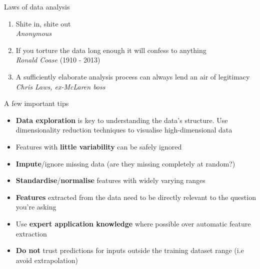 \documentclass[pdf]{beamer}
\begin{document}
\begin{frame}{Laws of data analysis}
\begin{enumerate}\addtolength{\itemsep}{1.5\baselineskip}
	\item<2-> Shite in, shite out\\
			\textit{Anonymous}
	\item<3-> If you torture the data long enough it will confess to anything\\
			\textit{Ronald Coase} (1910 - 2013)
	\item<4-> A sufficiently elaborate analysis process can always lend an air of legitimacy\\ 
			\textit{Chris Laws, ex-McLaren boss} 
\end{enumerate}
\end{frame}

\begin{frame}{A few important tips}
\begin{itemize}\addtolength{\itemsep}{0.5\baselineskip}
	\item<2-> \textbf{Data exploration} is key to understanding the data's structure. Use 
	dimensionality reduction techniques to visualise high-dimensional data 
	\item<3-> Features with \textbf{little variability} can be safely ignored
	\item<4-> \textbf{Impute}/ignore missing data (are they missing completely at random?)
	\item<5-> \textbf{Standardise}/\textbf{normalise} features with widely varying ranges
	\item<6-> \textbf{Features} extracted from the data need to be directly relevant to the question
	you're asking
	\item<7-> Use \textbf{expert application knowledge} where possible over automatic feature extraction 
	\item<8-> \textbf{Do not} trust predictions for inputs outside the training dataset range 
	(i.e avoid extrapolation)
\end{itemize}
\end{frame}
\end{document}

